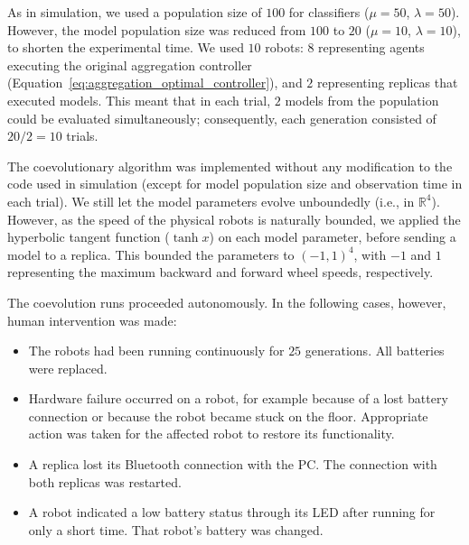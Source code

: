 As in simulation, we used a population size of $100$ for classifiers ($\mu = 50$,  $\lambda = 50$). However, the model population size was reduced from $100$ to $20$ ($\mu = 10$,  $\lambda = 10$), to shorten the experimental time. We used $10$ robots: $8$ representing agents executing the original aggregation controller (Equation~\eqref{eq:aggregation_optimal_controller}), and $2$ representing replicas that executed models. This meant that in each trial, $2$ models from the population could be evaluated simultaneously; consequently, each generation consisted of $20/2=10$ trials. 

The coevolutionary algorithm was implemented without any modification to the code used in simulation (except for model population size and observation time in each trial). We still let the model parameters evolve unboundedly (i.e., in $\mathbb{R}^4$). However, as the speed of the physical robots is naturally bounded, we applied the hyperbolic tangent function ($\tanh{x}$) on each model parameter, before sending a model to a replica. This bounded the parameters to $\left(-1,1\right)^4$, with $-1$ and $1$ representing the maximum backward and forward wheel speeds, respectively.

The coevolution runs proceeded autonomously. In the following cases, however, human intervention was made:
\begin{itemize}
\item The robots had been running continuously for $25$ generations. All batteries were replaced.

\item Hardware failure occurred on a robot, for example because of a lost battery connection or because the robot became stuck on the floor. Appropriate action was taken for the affected robot to restore its functionality.

\item A replica lost its Bluetooth connection with the PC. The connection with both replicas was restarted.

\item A robot indicated a low battery status through its LED after running for only a short time. That robot's battery was changed.
\end{itemize}

